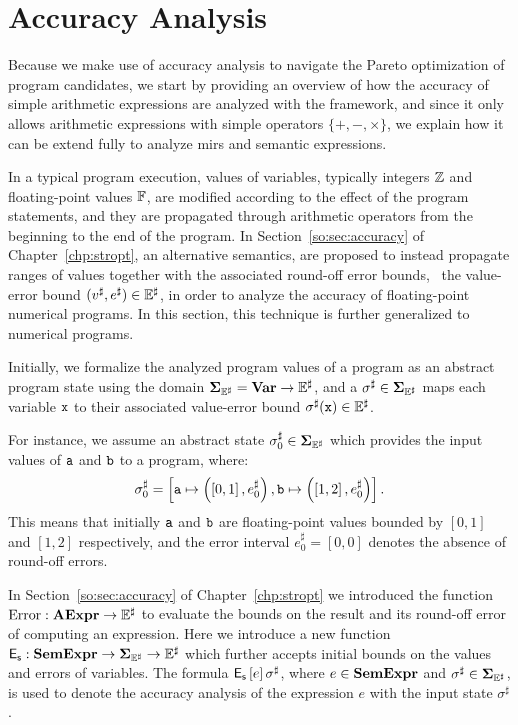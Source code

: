\section{Accuracy Analysis}
\label{po:sec:accuracy_analysis}

Because we make use of accuracy analysis to navigate the Pareto optimization
of program candidates, we start by providing an overview of how the accuracy
of simple arithmetic expressions are analyzed with the \soap{} framework, and
since it only allows arithmetic expressions with simple operators $\{+, -,
\times\}$, we explain how it can be extend fully to analyze \glspl{mir} and
semantic expressions.

In a typical program execution, values of variables, typically integers
$\mathbb{Z}$ and floating-point values $\mathbb{F}$, are modified according
to the effect of the program statements, and they are propagated through
arithmetic operators from the beginning to the end of the program.  In
Section~\ref{so:sec:accuracy} of Chapter~\ref{chp:stropt}, an alternative
semantics, are proposed to instead propagate ranges of values together with
the associated round-off error bounds, \ie~the value-error bound $(v^\sharp,
e^\sharp) \in \mathbb{E}^\sharp$, in order to analyze the accuracy of floating-point
numerical programs.  In this section, this technique is further generalized to
numerical programs.

Initially, we formalize the analyzed program values of a program as an abstract
program state using the domain $\mathbf{\Sigma}_{\mathbb{E}^\sharp} = \mathbf{Var} \to \mathbb{E}^\sharp$, and a
$\sigma^\sharp \in \mathbf{\Sigma}_{\mathbb{E}^\sharp}$ maps each variable $\texttt{x}$ to their associated
value-error bound $\sigma^\sharp(\texttt{x}) \in \mathbb{E}^\sharp$.

For instance, we assume an abstract state $\sigma^\sharp_0 \in \mathbf{\Sigma}_{\mathbb{E}^\sharp}$ which
provides the input values of $\texttt{a}$ and $\texttt{b}$ to a program, where:
\begin{equation}
    \sigma^\sharp_0 = \left[
        \texttt{a} \mapsto \left(\left[{0}, {1}\right], e^\sharp_0\right),
        \texttt{b} \mapsto \left(\left[{1}, {2}\right], e^\sharp_0\right) \right].
    \label{so:eq:example_state}
\end{equation}
This means that initially $\texttt{a}$ and $\texttt{b}$ are floating-point values bounded
by $[0, 1]$ and $[1, 2]$ respectively, and the error interval $e^\sharp_0 =
[0, 0]$ denotes the absence of round-off errors.

In Section~\ref{so:sec:accuracy} of Chapter~\ref{chp:stropt} we introduced the
function $\operatorname{\mathrm{Error}}: \mathbf{AExpr} \to \mathbb{E}^\sharp$ to evaluate the bounds on the result
and its round-off error of computing an expression.  Here we introduce a new
function $\operatorname{\mathsf{E}_\mathsf{s}}: \mathbf{SemExpr} \to \mathbf{\Sigma}_{\mathbb{E}^\sharp} \to \mathbb{E}^\sharp$ which further
accepts initial bounds on the values and errors of variables.  The formula
$\operatorname{\mathsf{E}_\mathsf{s}}\left[{e}\right]{\sigma^\sharp}$, where $e \in \mathbf{SemExpr}$ and $\sigma^\sharp
\in \mathbf{\Sigma}_{\mathbb{E}^\sharp}$, is used to denote the accuracy analysis of the expression $e$
with the input state $\sigma^\sharp$.

